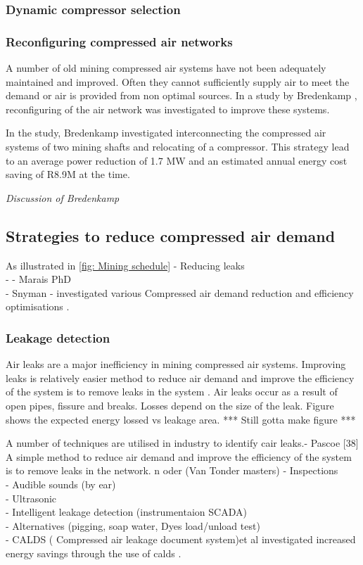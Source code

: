 		\subsubsection{Dynamic compressor selection}
		
		\subsubsection{Reconfiguring compressed air networks}
			A number of old mining compressed air systems  have not been adequately maintained and improved. Often they cannot sufficiently supply air to meet the demand or air is provided from non optimal sources. In a study by Bredenkamp \cite{Bredenkamp2013Masters}, reconfiguring of the air network was investigated to improve these systems.
			\par  
			In the study, Bredenkamp investigated interconnecting the compressed air systems of two mining shafts and relocating of a compressor. This strategy lead to an average power reduction of 1.7 MW and an estimated annual energy cost saving of R8.9M at the time.
			\par 
			\textit{Discussion of Bredenkamp}
			
	\subsection{Strategies to reduce compressed air demand}
	As illustrated in \cref{fig: Mining schedule}
		- Reducing leaks\\
		- 
		- Marais PhD\\
		- Snyman - investigated various Compressed air demand reduction and efficiency
		 optimisations \cite{Snyman2011Masters}.
		 
		 \subsubsection{Leakage detection}
		 Air leaks are a major inefficiency in mining compressed air systems. Improving leaks is relatively easier method to  reduce air demand and improve the efficiency of the system is to remove leaks in the system \cite{van2011sustaining}. Air leaks occur as a result of open pipes, fissure and breaks. Losses depend on the size of the leak. Figure \real{} shows the expected energy lossed vs leakage area. *** Still gotta make figure ***
		 \par
		 
		 A number of techniques are utilised in industry to identify cair leaks.- Pascoe [38]
		 A simple method to reduce air demand and improve the efficiency of the system is to remove leaks in the network. n oder
		 (Van Tonder masters)
		 - Inspections\\
		 - Audible sounds (by ear)\\
		 - Ultrasonic\\
		 - Intelligent leakage detection (instrumentaion SCADA)\\
		 - Alternatives (pigging, soap water, Dyes load/unload test)\\
		 -  CALDS ( Compressed air leakage document system)et al investigated increased energy savings through the use of \gls{calds} \cite{marais2009increased}.	
		 
